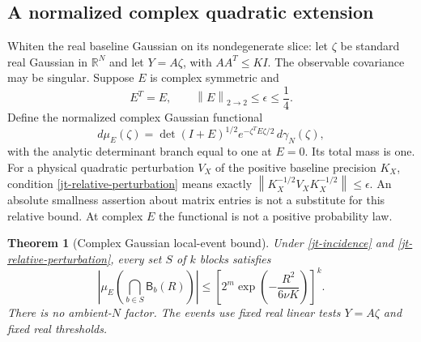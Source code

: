 \documentclass[11pt]{article}
\newtheorem{theorem}{Theorem}
\theoremstyle{remark}\newtheorem{remark}[theorem]{Remark}
\newcommand{\norm}[1]{\left\lVert#1\right\rVert}
\begin{document}
\subsection{A normalized complex quadratic extension}
\label{jt-complex-section}

Whiten the real baseline Gaussian on its nondegenerate slice:
let $\zeta$ be standard real Gaussian in $\mathbb R^N$ and
let $Y=A\zeta$, with $AA^T\le KI$. The observable covariance
may be singular. Suppose $E$ is complex symmetric and
\begin{equation}\label{jt-relative-perturbation}
 E^T=E,\qquad \norm E_{2\to2}\le\epsilon\le\frac14.
\end{equation}
Define the normalized complex Gaussian functional
\begin{equation}\label{jt-complex-measure}
 d\mu_E(\zeta)=\det(I+E)^{1/2}
      e^{-\zeta^TE\zeta/2}\,d\gamma_N(\zeta),
\end{equation}
with the analytic determinant branch equal to one at $E=0$.
Its total mass is one. For a physical quadratic perturbation
$V_X$ of the positive baseline precision $K_X$, condition
\eqref{jt-relative-perturbation} means exactly
$\norm{K_X^{-1/2}V_XK_X^{-1/2}}\le\epsilon$.
An absolute smallness assertion about matrix entries is not a
substitute for this relative bound. At complex $E$ the functional
is not a positive probability law.

\begin{theorem}[Complex Gaussian local-event bound]
\label{jt-complex-theorem}
Under \eqref{jt-incidence} and
\eqref{jt-relative-perturbation}, every set $S$ of $k$ blocks
satisfies
\begin{equation}\label{jt-complex-bound}
 \boxed{\quad
 \left|\mu_E\!\left(\bigcap_{b\in S}\mathsf B_b(R)\right)\right|
 \le\left[2^m\exp\!\left(-\frac{R^2}{6\nu K}\right)\right]^k.
 \quad}
\end{equation}
There is no ambient-$N$ factor. The events use fixed real linear
tests $Y=A\zeta$ and fixed real thresholds.
\end{theorem}
\end{document}

